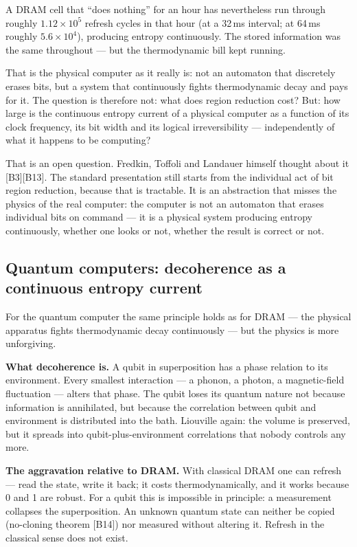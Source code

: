 \LK A DRAM cell that “does nothing” for an hour has nevertheless run through
roughly $1.12\times10^{5}$ refresh cycles in that hour (at a 32\,ms interval; at
64\,ms roughly $5.6\times10^{4}$), producing entropy continuously. The stored
information was the same throughout --- but the thermodynamic bill kept running.

That is the physical computer as it really is: not an automaton that discretely
erases bits, but a system that continuously fights thermodynamic decay and pays
for it. The question is therefore not: what does region reduction cost? But: how
large is the continuous entropy current of a physical computer as a function of
its clock frequency, its bit width and its logical irreversibility ---
independently of what it happens to be computing?

That is an open question. Fredkin, Toffoli and Landauer himself thought about it
[B3][B13]. The standard presentation still starts from the individual act of bit
region reduction, because that is tractable. It is an abstraction that misses the
physics of the real computer: the computer is not an automaton that erases
individual bits on command --- it is a physical system producing entropy
continuously, whether one looks or not, whether the result is correct or not.

\subsection{Quantum computers: decoherence as a continuous entropy current}

For the quantum computer the same principle holds as for DRAM --- the physical
apparatus fights thermodynamic decay continuously --- but the physics is more
unforgiving.

\textbf{What decoherence is.} A qubit in superposition has a phase relation to its
environment. Every smallest interaction --- a phonon, a photon, a magnetic-field
fluctuation --- alters that phase. The qubit loses its quantum nature not because
information is annihilated, but because the correlation between qubit and
environment is distributed into the bath. Liouville again: the volume is
preserved, but it spreads into qubit-plus-environment correlations that nobody
controls any more.

\textbf{The aggravation relative to DRAM.} With classical DRAM one can refresh ---
read the state, write it back; it costs thermodynamically, and it works because 0
and 1 are robust. For a qubit this is impossible in principle: a measurement
collapses the superposition. An unknown quantum state can neither be copied
(no-cloning theorem [B14]) nor measured without altering it. Refresh in the
classical sense does not exist.

